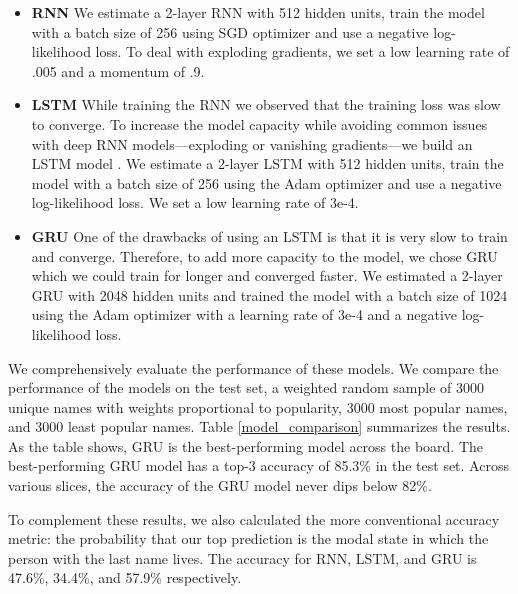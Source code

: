 \documentclass[11pt,  letterpaper]{article}
\begin{document}
\begin{itemize}

    \item \textbf{RNN} We estimate a 2-layer RNN \citep{10.1145/3426826.3426842, 8469258} with 512 hidden units, train the model with a batch size of 256 using SGD optimizer and use a negative log-likelihood loss. To deal with exploding gradients, we set a low learning rate of .005 and a momentum of .9.

    \item \textbf{LSTM} While training the RNN we observed that the training loss was slow to converge. To increase the model capacity while avoiding common issues with deep RNN models---exploding or vanishing gradients---we build an LSTM model \citep{hochreiter1997long}. We estimate a 2-layer LSTM with 512 hidden units, train the model with a batch size of 256 using the Adam optimizer and use a negative log-likelihood loss. We set a low learning rate of 3e-4.

    \item \textbf{GRU} One of the drawbacks of using an LSTM is that it is very slow to train and converge. Therefore, to add more capacity to the model, we chose GRU which we could train for longer and converged faster. We estimated a 2-layer GRU \citep{cho2014properties} with 2048 hidden units and trained the model with a batch size of 1024 using the Adam optimizer with a learning rate of 3e-4 and a negative log-likelihood loss.

\end{itemize}

We comprehensively evaluate the performance of these models. We compare the performance of the models on the test set, a weighted random sample of 3000 unique names with weights proportional to popularity, 3000 most popular names, and 3000 least popular names. Table \ref{model_comparison} summarizes the results. As the table shows, GRU is the best-performing model across the board. The best-performing GRU model has a top-3 accuracy of 85.3\% in the test set. Across various slices, the accuracy of the GRU model never dips below 82\%.

To complement these results, we also calculated the more conventional accuracy metric: the probability that our top prediction is the modal state in which the person with the last name lives. The accuracy for RNN, LSTM, and GRU is 47.6\%, 34.4\%, and 57.9\% respectively.


\end{document}
